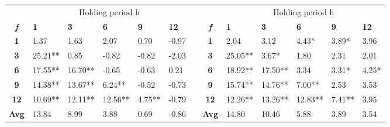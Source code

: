\documentclass{article}
\begin{document}
\begin{table}[htbp!]
\begin{adjustwidth}{-2cm}{}
\begin{tabular}{ccccccccccccc}
\cmidrule{2-6}\cmidrule{9-13}          & \multicolumn{5}{c}{Holding period h}  &       &       & \multicolumn{5}{c}{Holding period h} \\
    \textit{\textbf{f}} & \multicolumn{1}{l}{\textbf{1}} & \multicolumn{1}{l}{\textbf{3}} & \multicolumn{1}{l}{\textbf{6}} & \multicolumn{1}{l}{\textbf{9}} & \multicolumn{1}{l}{\textbf{12}} &       & \textit{\textbf{f}} & \multicolumn{1}{l}{\textbf{1}} & \multicolumn{1}{l}{\textbf{3}} & \multicolumn{1}{l}{\textbf{6}} & \multicolumn{1}{l}{\textbf{9}} & \multicolumn{1}{l}{\textbf{12}} \\
\cmidrule{2-6}\cmidrule{9-13}    \textbf{1} & \multicolumn{1}{l}{1.37} & \multicolumn{1}{l}{1.63} & \multicolumn{1}{l}{2.07} & \multicolumn{1}{l}{0.70} & \multicolumn{1}{l}{-0.97} &       & \textbf{1} & \multicolumn{1}{l}{2.04} & \multicolumn{1}{l}{3.12} & \multicolumn{1}{l}{4.43*} & \multicolumn{1}{l}{3.89*} & \multicolumn{1}{l}{3.96} \\
    \textbf{3} & \multicolumn{1}{l}{25.21**} & \multicolumn{1}{l}{0.85} & \multicolumn{1}{l}{-0.82} & \multicolumn{1}{l}{-0.82} & \multicolumn{1}{l}{-2.03} &       & \textbf{3} & \multicolumn{1}{l}{25.05**} & \multicolumn{1}{l}{3.67*} & \multicolumn{1}{l}{1.80} & \multicolumn{1}{l}{2.31} & \multicolumn{1}{l}{2.01} \\
    \textbf{6} & \multicolumn{1}{l}{17.55**} & \multicolumn{1}{l}{16.70**} & \multicolumn{1}{l}{-0.65} & \multicolumn{1}{l}{-0.63} & \multicolumn{1}{l}{0.21} &       & \textbf{6} & \multicolumn{1}{l}{18.92**} & \multicolumn{1}{l}{17.50**} & \multicolumn{1}{l}{3.34} & \multicolumn{1}{l}{3.31*} & \multicolumn{1}{l}{4.25*} \\
    \textbf{9} & \multicolumn{1}{l}{14.38**} & \multicolumn{1}{l}{13.67**} & \multicolumn{1}{l}{6.24**} & \multicolumn{1}{l}{-0.52} & \multicolumn{1}{l}{-0.73} &       & \textbf{9} & \multicolumn{1}{l}{15.74**} & \multicolumn{1}{l}{14.76**} & \multicolumn{1}{l}{7.00**} & \multicolumn{1}{l}{2.53} & \multicolumn{1}{l}{3.53} \\
    \textbf{12} & \multicolumn{1}{l}{10.69**} & \multicolumn{1}{l}{12.11**} & \multicolumn{1}{l}{12.56**} & \multicolumn{1}{l}{4.75**} & \multicolumn{1}{l}{-0.79} &       & \textbf{12} & \multicolumn{1}{l}{12.26**} & \multicolumn{1}{l}{13.26**} & \multicolumn{1}{l}{12.83**} & \multicolumn{1}{l}{7.41**} & \multicolumn{1}{l}{3.95} \\
\cmidrule{2-6}\cmidrule{9-13}    \textbf{Avg} & \multicolumn{1}{l}{13.84} & \multicolumn{1}{l}{8.99} & \multicolumn{1}{l}{3.88} & \multicolumn{1}{l}{0.69} & \multicolumn{1}{l}{-0.86} &       & \textbf{Avg} & \multicolumn{1}{l}{14.80} & \multicolumn{1}{l}{10.46} & \multicolumn{1}{l}{5.88} & \multicolumn{1}{l}{3.89} & \multicolumn{1}{l}{3.54} \\

\end{tabular}
\end{adjustwidth}
\end{table}
\end{document}
